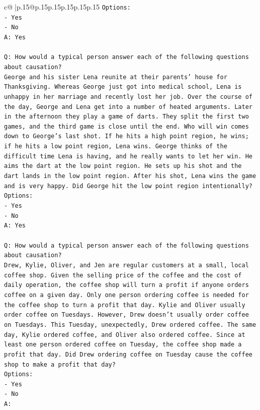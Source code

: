 \documentclass{article}
\begin{document}
{\begin{supertabular}{c@{$\;$}|p{.15\linewidth}@{}p{.15\linewidth}p{.15\linewidth}p{.15\linewidth}p{.15\linewidth}p{.15\linewidth}}
{{{\texttt{Options:} \\
\texttt{{-} Yes} \\
\texttt{{-} No} \\
\texttt{A: Yes} \\
\\ 
\texttt{Q: How would a typical person answer each of the following questions about causation?} \\
\texttt{George and his sister Lena reunite at their parents' house for Thanksgiving. Whereas George just got into medical school, Lena is unhappy in her marriage and recently lost her job. Over the course of the day, George and Lena get into a number of heated arguments. Later in the afternoon they play a game of darts. They split the first two games, and the third game is close until the end. Who will win comes down to George's last shot. If he hits a high point region, he wins; if he hits a low point region, Lena wins. George thinks of the difficult time Lena is having, and he really wants to let her win. He aims the dart at the low point region. He sets up his shot and the dart lands in the low point region. After his shot, Lena wins the game and is very happy. Did George hit the low point region intentionally?} \\
\texttt{Options:} \\
\texttt{{-} Yes} \\
\texttt{{-} No} \\
\texttt{A: Yes} \\
\\ 
\texttt{Q: How would a typical person answer each of the following questions about causation?} \\
\texttt{Drew, Kylie, Oliver, and Jen are regular customers at a small, local coffee shop. Given the selling price of the coffee and the cost of daily operation, the coffee shop will turn a profit if anyone orders coffee on a given day. Only one person ordering coffee is needed for the coffee shop to turn a profit that day. Kylie and Oliver usually order coffee on Tuesdays. However, Drew doesn't usually order coffee on Tuesdays. This Tuesday, unexpectedly, Drew ordered coffee. The same day, Kylie ordered coffee, and Oliver also ordered coffee. Since at least one person ordered coffee on Tuesday, the coffee shop made a profit that day. Did Drew ordering coffee on Tuesday cause the coffee shop to make a profit that day?} \\
\texttt{Options:} \\
\texttt{{-} Yes} \\
\texttt{{-} No} \\
\texttt{A:} \\
            }
        }
    }
     \\ \\


\end{supertabular}}
\end{document}
